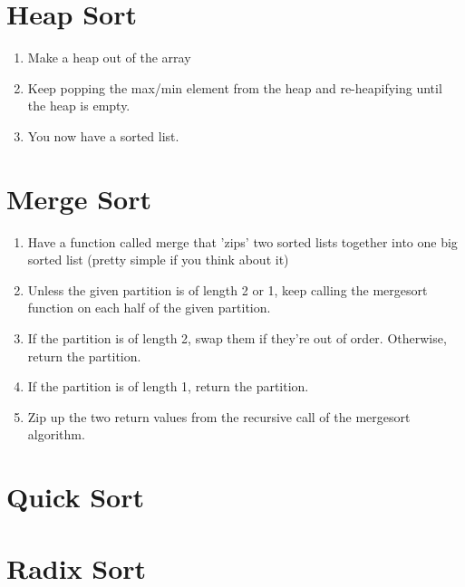 \documentclass[a4paper,12pt]{report}
\begin{document}
\section{Heap Sort}
\begin{enumerate}
\item Make a heap out of the array
\item Keep popping the max/min element from the heap and re-heapifying until the heap is empty.
\item You now have a sorted list.
\end{enumerate}

\section{Merge Sort}
\begin{enumerate}
\item Have a function called merge that 'zips' two sorted lists together into one big sorted list (pretty simple if you think about it)
\item Unless the given partition is of length 2 or 1, keep calling the mergesort function on each half of the given partition.
\item If the partition is of length 2, swap them if they're out of order. Otherwise, return the partition.
\item If the partition is of length 1, return the partition.
\item Zip up the two return values from the recursive call of the mergesort algorithm.
\end{enumerate}

\section{Quick Sort}
\section{Radix Sort}
\end{document}
